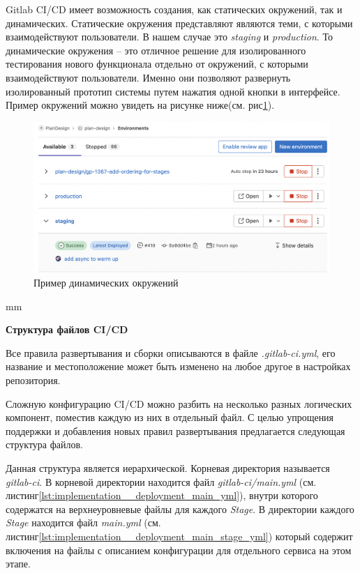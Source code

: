 Gitlab CI/CD имеет возможность создания, как статических окружений, так и динамических.
Статические окружения представляют являются теми, с которыми взаимодействуют пользователи.
В нашем случае это \textit{staging} и \textit{production}.
То динамические окружения -- это отличное решение для изолированного тестирования нового функционала
отдельно от окружений, с которыми взаимодействуют пользователи. Именно они позволяют развернуть
изолированный прототип системы путем нажатия одной кнопки в интерфейсе.
Пример окружений можно увидеть на рисунке ниже(см. рис\ref{pic:implementation__deployment-environment}).
\begin{figure}[H]
	\includegraphics[width=\textwidth]{implementation/pictures/deployment/environment}
	\caption{Пример динамических окружений}
	\label{pic:implementation__deployment-environment}
\end{figure}
 mm

\noindent \textbf{Структура файлов CI/CD}

Все правила развертывания и сборки описываются в файле \textit{.gitlab-ci.yml},
его название и местоположение может быть изменено на любое другое в настройках репозитория.

Сложную конфигурацию CI/CD можно разбить на несколько разных логических компонент, поместив каждую из них
в отдельный файл.
С целью упрощения поддержки и добавления новых правил развертывания предлагается следующая структура файлов.

\vskip 5mm

Данная структура является иерархической.
Корневая директория называется \textit{gitlab-ci}. В корневой директории находится файл
\textit{gitlab-ci/main.yml}
(см. листинг\ref{lst:implementation__deployment_main_yml}),
внутри которого содержатся на верхнеуровневые файлы для каждого \textit{Stage}.
В директории каждого \textit{Stage} находится файл \textit{main.yml} (см. листинг\ref{lst:implementation__deployment_main_stage_yml})
который содержит включения на файлы
с описанием конфигурации для отдельного сервиса на этом этапе.

